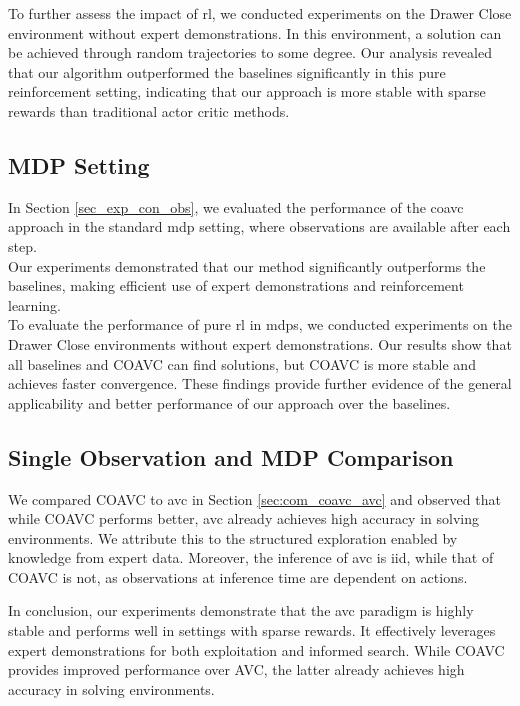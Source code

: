 To further assess the impact of \ac{rl}, we conducted experiments on the Drawer Close environment without expert demonstrations. 
In this environment, a solution can be achieved through random trajectories to some degree. 
Our analysis revealed that our algorithm outperformed the baselines significantly in this pure reinforcement setting, 
indicating that our approach is more stable with sparse rewards than traditional actor critic methods.\\




\subsection{MDP Setting}
In Section \ref{sec_exp_con_obs}, we evaluated the performance of the \ac{coavc} approach in the standard \ac{mdp} setting, 
where observations are available after each step.\\

Our experiments demonstrated that our method significantly outperforms the baselines, making efficient use of expert demonstrations and reinforcement learning.\\

To evaluate the performance of pure \ac{rl} in \ac{mdp}s, we conducted experiments on the Drawer Close 
environments without expert demonstrations. Our results show that all baselines and COAVC can find solutions, but COAVC is more stable and achieves 
faster convergence. These findings provide further evidence of the general applicability and better performance of our approach over the baselines. 

\subsection{Single Observation and MDP Comparison}
We compared COAVC to \ac{avc} in Section \ref{sec:com_coavc_avc} and observed that while COAVC performs better, 
\ac{avc} already achieves high accuracy in solving environments. We attribute this to the structured exploration enabled by knowledge from 
expert data. Moreover, the inference of \ac{avc} is \ac{iid}, while that of COAVC is not, as observations at inference time are dependent on actions. 

In conclusion, our experiments demonstrate that the \ac{avc} paradigm is highly stable and performs well in settings with sparse rewards. 
It effectively leverages expert demonstrations for both exploitation and informed search. While COAVC provides improved performance over 
AVC, the latter already achieves high accuracy in solving environments.


